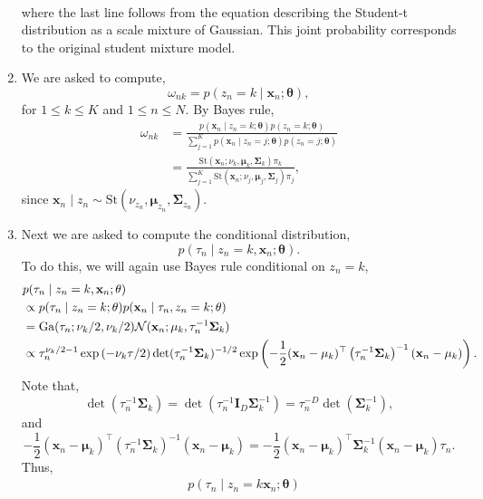 \begin{enumerate}[label = (\alph*)]
\begin{align*}
    \end{align*}
    where the last line follows from the equation describing the Student-t distribution as a scale mixture of Gaussian. This joint probability corresponds to the original student mixture model.
    \item We are asked to compute,
    \[\omega_{nk} = p(z_n = k \mid \mathbf{x}_n;\mathbf{\theta}), \]
    for $1 \le k \le K$ and $1 \le n \le N$. By Bayes rule,
    \begin{align*}
        \omega_{nk} &= \frac{p(\mathbf{x}_n \mid z_n = k; \mathbf{\theta})p(z_n = k ;\mathbf{\theta})}{\sum_{j=1}^K p(\mathbf{x}_n \mid z_n = j; \mathbf{\theta})p(z_n = j ;\mathbf{\theta})}\\
        &= \frac{\mathrm{St}(\mathbf{x}_n ; \nu_k,\mathbf{\mu}_k, \mathbf{\Sigma}_k)\pi_k}{\sum_{j=1}^K \mathrm{St}(\mathbf{x}_n ; \nu_j,\mathbf{\mu}_j, \mathbf{\Sigma}_j)\pi_j},
    \end{align*}
    since $\mathbf{x}_n \mid z_n \sim \mathrm{St}\left(\nu_{z_n},\mathbf{\mu}_{z_n},\mathbf{\Sigma}_{z_n}\right)$.
    \item Next we are asked to compute the conditional distribution,
    \[p(\tau_n \mid z_n=k, \mathbf{x}_n; \mathbf{\theta}). \]
    To do this, we will again use Bayes rule conditional on $z_n=k$,
    \begin{align*}
        &p(\tau_n \mid z_n=k, \mathbf{x}_n; \mathbf{\theta})\\
        &\propto p(\tau_n \mid z_n=k;\mathbf{\theta})p(\mathbf{x}_n \mid \tau_n,z_n=k;\mathbf{\theta})\\
        &= \mathrm{Ga}(\tau_n;\nu_k/2, \nu_k/2){\mathcal N}(\mathbf{x}_n; \mathbf{\mu}_k, \tau_n^{-1}\mathbf{\Sigma}_k)\\
        &\propto \tau_n^{\nu_k/2 - 1}\exp\left(-\nu_k\tau/2\right)\det(\tau_n^{-1}\mathbf{\Sigma}_k)^{-1/2}\exp\left(-\frac{1}{2}(\mathbf{x}_n-\mathbf{\mu}_k)^\top\left(\tau_n^{-1}\mathbf{\Sigma}_k\right)^{-1}(\mathbf{x}_n - \mathbf{\mu}_k)\right).
    \end{align*}
    Note that,
    \[\det(\tau_n^{-1}\mathbf{\Sigma}_k) = \det(\tau_n^{-1}\mathbf{I}_D\mathbf{\Sigma}_k^{-1}) = \tau_n^{-D}\det(\mathbf{\Sigma}_k^{-1}), \]
    and
    \[-\frac{1}{2}(\mathbf{x}_n-\mathbf{\mu}_k)^\top\left(\tau_n^{-1}\mathbf{\Sigma}_k\right)^{-1}(\mathbf{x}_n - \mathbf{\mu}_k) =  - \frac{1}{2}(\mathbf{x}_n-\mathbf{\mu}_k)^\top\mathbf{\Sigma}_k^{-1}(\mathbf{x}_n - \mathbf{\mu}_k)\tau_n.\]
    Thus,
    \begin{align*}
        &p(\tau_n\mid z_n=k \mathbf{x}_n;\mathbf{\theta})\\

\end{align*}
\end{enumerate}
